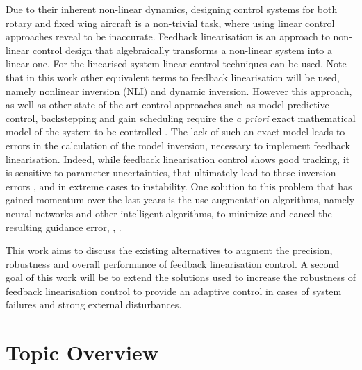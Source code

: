 Due to their inherent non-linear dynamics, designing control systems for both rotary and fixed wing aircraft is a non-trivial task, where using linear control approaches reveal to be inaccurate. Feedback linearisation is an approach to non-linear control design that algebraically transforms a non-linear system into a linear one. For the linearised system linear control techniques can be used. Note that in this work other equivalent terms to feedback linearisation will be used, namely nonlinear inversion (NLI) and dynamic inversion. 
However this approach, as well as other state-of-the art control approaches such as model predictive control, backstepping and gain scheduling require the \textit{a priori} exact mathematical model of the system to be controlled \cite{SotA_IFCS}. The lack of such an exact model leads to errors in the calculation of the model inversion, necessary to implement feedback linearisation. Indeed, while feedback linearisation control shows good tracking, it is sensitive to parameter uncertainties, that ultimately lead to these inversion errors \cite{SotA_ControlAlgorithm}, and in extreme cases to instability. One solution to this problem that has gained momentum over the last years is the use augmentation algorithms, namely neural networks and other intelligent algorithms, to minimize and cancel the resulting guidance error\cite{NLI+NN}, \cite{NLI+NN_IFCS}, \cite{NLI+NN_chinese}. 

This work aims to discuss the existing alternatives to augment the precision, robustness and overall performance of feedback linearisation control. A second goal of this work will be to extend the solutions used to increase the robustness of feedback linearisation control to provide an adaptive control in cases of system failures and strong external disturbances.

\section{Topic Overview}
\label{section:overview}

